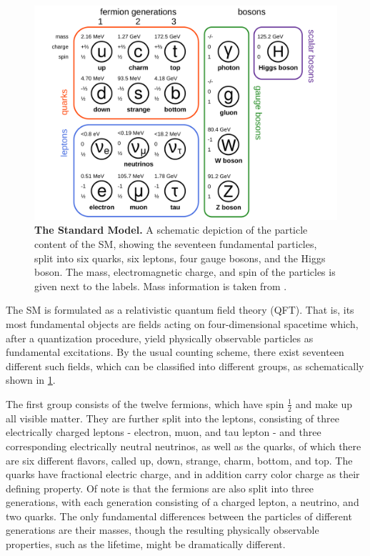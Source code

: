 \begin{figure}[ht]
    \centering
    \includegraphics[width=0.9 \textwidth]{figures/smsketch_colors.pdf}
    \caption{\textbf{The Standard Model.} A schematic depiction of the particle content of the SM, showing the seventeen fundamental particles, split into six quarks, six leptons, four gauge bosons, and the Higgs boson. The mass, electromagnetic charge, and spin of the particles is given next to the labels. Mass information is taken from .}
    \label{fig:theory:sm}
\end{figure}

The SM is formulated as a relativistic quantum field theory (QFT). That is, its most fundamental objects are fields acting on four-dimensional spacetime which, after a quantization procedure, yield physically observable particles as fundamental excitations. By the usual counting scheme, there exist seventeen different such fields, which can be classified into different groups, as schematically shown in \cref{fig:theory:sm}.

The first group consists of the twelve fermions, which have spin $\frac{1}{2}$ and make up all visible matter. They are further split into the leptons, consisting of three electrically charged leptons - electron, muon, and tau lepton - and three corresponding electrically neutral neutrinos, as well as the quarks, of which there are six different flavors, called up, down, strange, charm, bottom, and top. The quarks have fractional electric charge, and in addition carry color charge as their defining property. Of note is that the fermions are also split into three generations, with each generation consisting of a charged lepton, a neutrino, and two quarks. The only fundamental differences between the particles of different generations are their masses, though the resulting physically observable properties, such as the lifetime, might be dramatically different.

